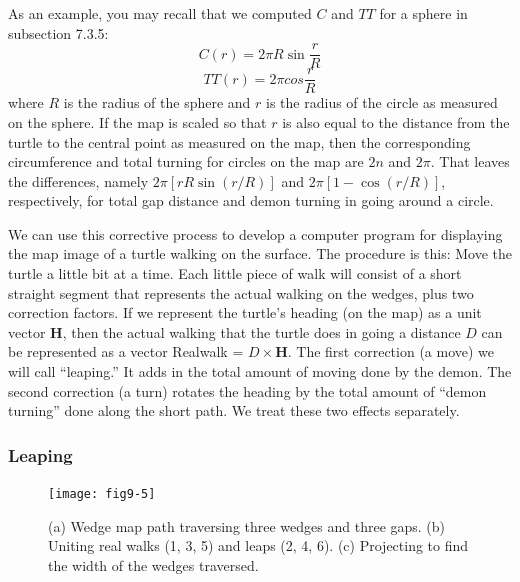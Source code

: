 \documentclass{book}
\begin{document}
As an example, you may recall that we computed $C$ and $TT$ for a
sphere in subsection 7.3.5:
$$C(r) = 2 \pi R \sin \frac {r} {R}$$
$$TT(r) = 2 \pi cos\frac {r} {R}$$
where $R$ is the radius of the sphere and $r$ is the radius of the circle as
measured on the sphere. If the map is scaled so that $r$ is also equal
to the distance from the turtle to the central point as measured on the
map, then the corresponding circumference and total turning for circles
on the map are $2n$ and $2 \pi$. That leaves the differences, namely $2 \pi [ r R \sin (r / R)]$ and $2 \pi [1 - \cos (r / R)]$, respectively, for total gap distance
and demon turning in going around a circle.

We can use this corrective process to develop a computer program
for displaying the map image of a turtle walking on the surface. The
procedure is this: Move the turtle a little bit at a time. Each little
piece of walk will consist of a short straight segment that represents
the actual walking on the wedges, plus two correction factors. If we
represent the turtle's heading (on the map) as a unit vector \textbf{H}, then
the actual walking that the turtle does in going a distance $D$ can be
represented as a vector Realwalk = $D \times \mathbf{H}$. The first correction (a
move) we will call ``leaping.'' It adds in the total amount of moving
done by the demon. The second correction (a turn) rotates the heading
by the total amount of ``demon turning'' done along the short path. We
treat these two effects separately.

\subsubsection{Leaping}

\begin{figure}
\begin{center}
\texttt{[image: fig9-5]}
\caption{(a) Wedge map path traversing three wedges and three gaps. (b) Uniting real walks (1, 3, 5) and leaps (2, 4, 6). (c) Projecting to find the width of the wedges traversed.}
\end{center}
\end{figure}
\end{document}
